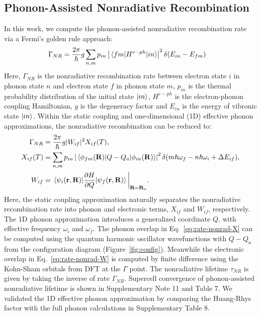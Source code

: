 \subsection{Phonon-Assisted Nonradiative Recombination} In this work, we compute the phonon-assisted nonradiative recombination rate via a Fermi's golden rule approach:
\begin{align}
    \Gamma_{NR} &= \frac{2\pi}{\hbar}g\sum_{n,m}p_{in}\left|\mel{fm}{H^{e-ph}}{in}\right|^2\delta(E_{in}-E_{fm}) \label{eq:rate-nonradiative-fg}
\end{align}
Here, $\Gamma_{NR}$ is the nonradiative recombination rate between electron state $i$ in phonon state $n$ and electron state $f$ in phonon state $m$, $p_{in}$ is the thermal probability distribution of the initial state $\ket{in}$, $H^{e-ph}$ is the electron-phonon coupling Hamiltonian, $g$ is the degeneracy factor and $E_{in}$ is the energy of vibronic state $\ket{in}$. Within the static coupling and one-dimensional (1D) effective phonon approximations, the nonradiative recombination can be reduced to:
\begin{align}
    \Gamma_{NR} &= \frac{2\pi}{\hbar}g|W_{if}|^2 X_{if}(T), \label{eq:rate-nonrad-allterms}\\
    X_{if}(T) &= \sum_{n,m}p_{in}\left|\mel{\phi_{fm}(\textbf{R})}{Q-Q_a}{\phi_{in}(\mathbf{R})}\right|^2 \delta(m\hbar\omega_f - n\hbar\omega_i+\Delta E_{if}), \label{eq:rate-nonrad-X} \\
    W_{if} &= \mel{\psi_i(\mathbf{r}, \textbf{R})}{\frac{\partial H}{\partial Q}}{\psi_f(\mathbf{r},\textbf{R})}\bigg{|}_{\textbf{R}=\textbf{R}_a}. \label{eq:rate-nonrad-W}
\end{align}
Here, the static coupling approximation naturally separates the nonradiative recombination rate into phonon and electronic terms, $X_{if}$ and $W_{if}$, respectively. The 1D phonon approximation introduces a generalized coordinate $Q$, with effective frequency $\omega_i$ and $\omega_f$. The phonon overlap in Eq.~\ref{eq:rate-nonrad-X} can be computed using the quantum harmonic oscillator wavefunctions with $Q-Q_a$ from the configuration diagram (Figure~\ref{fig:config}). Meanwhile the electronic overlap in Eq.~\ref{eq:rate-nonrad-W} is computed by finite difference using the Kohn-Sham orbitals from DFT at the $\Gamma$ point. The nonradiative lifetime $\tau_{NR}$ is given by taking the inverse of rate $\Gamma_{NR}$. Supercell convergence of phonon-assisted nonradiative lifetime is shown in Supplementary Note 11 and Table 7. We validated the 1D effective phonon approximation by comparing the Huang-Rhys factor with the full phonon calculations in Supplementary Table 8.

